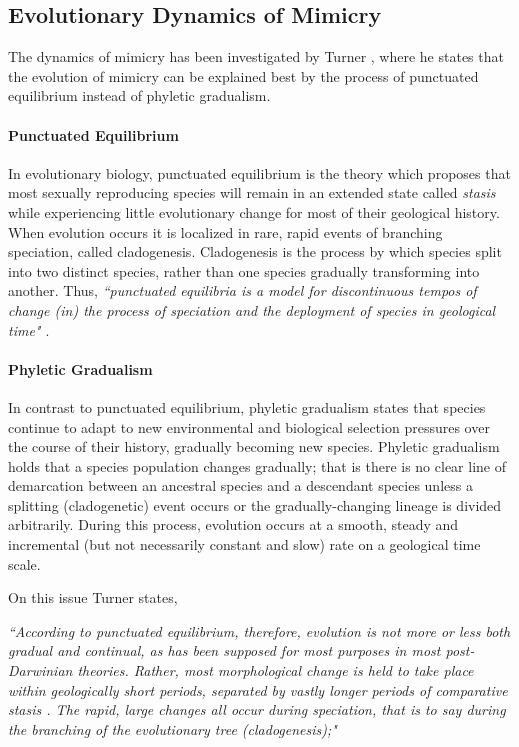 \documentclass[letterpaper]{article}
\numberwithin{equation}{section}
\begin{document}
\subsection{Evolutionary Dynamics of Mimicry}
\label{sec:evolutionary-dynamics-of-mimicry}
The dynamics of mimicry has been investigated by Turner \cite{turner1988}, where he states that the evolution of mimicry can be explained best by the process of punctuated equilibrium instead of phyletic gradualism. 

\paragraph{Punctuated Equilibrium}
In evolutionary biology, punctuated equilibrium is the theory which proposes that most sexually reproducing species will remain in an extended state called \textit{stasis} while experiencing little evolutionary change for most of their geological history. When evolution occurs it is localized in rare, rapid events of branching speciation, called cladogenesis. Cladogenesis is the process by which species split into two distinct species, rather than one species gradually transforming into another. Thus, \textsl{``punctuated equilibria is a model for discontinuous tempos of change (in) the process of speciation and the deployment of species in geological time" \cite{gould1977}}. 

\paragraph{Phyletic Gradualism}
In contrast to punctuated equilibrium, phyletic gradualism states that species continue to adapt to new environmental and biological selection pressures over the course of their history, gradually becoming new species. Phyletic gradualism holds that a species population changes gradually; that is there is no clear line of demarcation between an ancestral species and a descendant species unless a splitting (cladogenetic) event occurs or the gradually-changing lineage is divided arbitrarily. During this process, evolution occurs at a smooth, steady and incremental (but not necessarily constant and slow) rate on a geological time scale. 

On this issue Turner states,

\textsl{``According to punctuated equilibrium, therefore, evolution is not more or less both gradual and continual, as has been supposed for most purposes in most post-Darwinian theories. Rather, most morphological change is held to take place within geologically short periods, separated by vastly longer periods of comparative stasis \cite{eldredge1972}. The rapid, large changes all occur during speciation, that is to say during the branching of the evolutionary tree (cladogenesis);" \cite{turner1988}}
\end{document}
